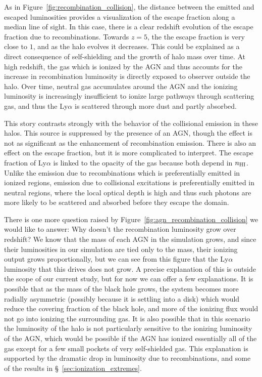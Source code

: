 As in Figure~\ref{fig:recombination_collision}, the distance between the emitted and escaped luminosities provides a visualization of the escape fraction along a median line of sight.
In this case, there is a clear redshift evolution of the escape fraction due to recombinations.
Towards $z=5$, the the escape fraction is very close to $1$, and as the halo evolves it decreases.
This could be explained as a direct consequence of self-shielding and the growth of halo mass over time.
At high redshift, the gas which is ionized by the AGN and thus accounts for the increase in recombination luminosity is directly exposed to observer outside the halo.
Over time, neutral gas accumulates around the AGN and the ionizing luminosity is increasingly insufficient to ionize large pathways through scattering gas, and thus the Ly$\alpha$ is scattered through more dust and partly absorbed.

This story contrasts strongly with the behavior of the collisional emission in these halos.
This source is suppressed by the presence of an AGN, though the effect is not as significant as the enhancement of recombination emission.
There is also an effect on the escape fraction, but it is more complicated to interpret.
The escape fraction of Ly$\alpha$ is linked to the opacity of the gas because both depend in $n_{\rm{HI}}$.
Unlike the emission due to recombinations which is preferentially emitted in ionized regions, emission due to collisional excitations is preferentially emitted in neutral regions, where the local optical depth is high and thus such photons are more likely to be scattered and absorbed before they escape the domain.

There is one more question raised by Figure~\ref{fig:agn_recombination_collision} we would like to answer: Why doesn't the recombination luminosity grow over redshift?
We know that the mass of each AGN in the simulation grows, and since their luminosities in our simulation are tied only to the mass, their ionizing output grows proportionally, but we can see from this figure that the Ly$\alpha$ luminosity that this drives does not grow.
A precise explanation of this is outside the scope of our current study, but for now we can offer a few explanations.
It is possible that as the mass of the black hole grows, the system becomes more radially asymmetric (possibly because it is settling into a disk) which would reduce the covering fraction of the black hole, and more of the ionizing flux would not go into ionizing the surrounding gas.
It is also possible that in this scenario the luminosity of the halo is not particularly sensitive to the ionizing luminosity of the AGN, which would be possible if the AGN has ionized essentially all of the gas except for a few small pockets of very self-shielded gas.
This explanation is supported by the dramatic drop in luminosity due to recombinations, and some of the results in \S~\ref{sec:ionization_extremes}.

